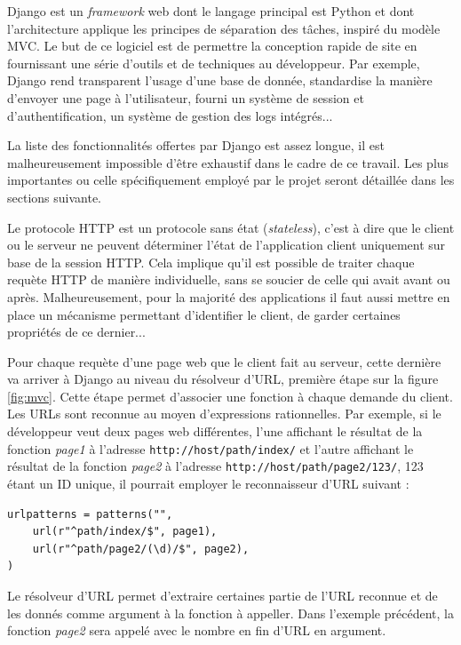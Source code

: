 \documentclass[a4paper,12pt]{article}
\begin{document}
Django est un \textit{framework} web dont le langage principal est Python et
dont l'architecture applique les principes de séparation des tâches, inspiré du
modèle MVC. Le but de ce logiciel est de permettre la conception rapide de site
en fournissant une série d'outils et de techniques au développeur. Par exemple,
Django rend transparent l'usage d'une base de donnée, standardise la manière
d'envoyer une page à l'utilisateur, fourni un système de session et d'authentification,
un système de gestion des logs intégrés...

La liste des fonctionnalités offertes par Django est assez longue, il est malheureusement
impossible d'être exhaustif dans le cadre de ce travail. Les plus importantes
ou celle spécifiquement employé par le projet seront détaillée dans les sections suivante.

Le protocole HTTP est un protocole sans état (\textit{stateless}), c'est à dire
que le client ou le serveur ne peuvent déterminer l'état de l'application client uniquement
sur base de la session HTTP. Cela implique qu'il est possible de traiter chaque requète HTTP
de manière individuelle, sans se soucier de celle qui avait avant ou après. Malheureusement,
pour la majorité des applications il faut aussi mettre en place un mécanisme permettant
d'identifier le client, de garder certaines propriétés de ce dernier...

Pour chaque requète d'une page web que le client fait au serveur, cette dernière
va arriver à Django au niveau du résolveur d'URL, première étape sur la figure \ref{fig:mvc}.
Cette étape permet d'associer une fonction
à chaque demande du client. Les URLs sont reconnue au moyen d'expressions rationnelles.
Par exemple, si le développeur veut deux pages web différentes, l'une affichant
le résultat de la fonction \textit{page1} à l'adresse \texttt{http://host/path/index/} et
l'autre affichant le résultat de la fonction \textit{page2} à l'adresse
\texttt{http://host/path/page2/123/}, 123 étant un ID unique, il pourrait employer
le reconnaisseur d'URL suivant :

\begin{verbatim}
urlpatterns = patterns("",
    url(r"^path/index/$", page1),
    url(r"^path/page2/(\d)/$", page2),
)
\end{verbatim}

Le résolveur d'URL permet d'extraire certaines partie de l'URL reconnue et de les donnés
comme argument à la fonction à appeller. Dans l'exemple précédent, la fonction \textit{page2}
sera appelé avec le nombre en fin d'URL en argument.
\end{document}
